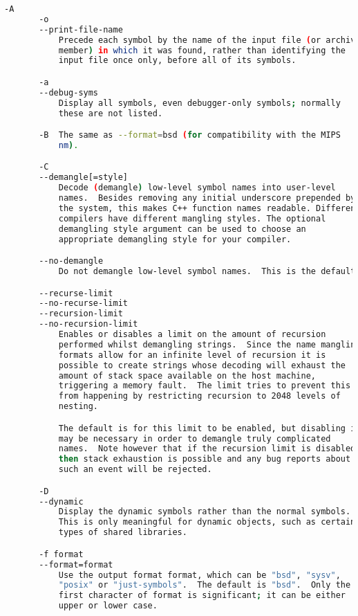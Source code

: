 {{\begin{lstlisting}[language=bash]
       -A
       -o
       --print-file-name
           Precede each symbol by the name of the input file (or archive
           member) in which it was found, rather than identifying the
           input file once only, before all of its symbols.

       -a
       --debug-syms
           Display all symbols, even debugger-only symbols; normally
           these are not listed.

       -B  The same as --format=bsd (for compatibility with the MIPS
           nm).

       -C
       --demangle[=style]
           Decode (demangle) low-level symbol names into user-level
           names.  Besides removing any initial underscore prepended by
           the system, this makes C++ function names readable. Different
           compilers have different mangling styles. The optional
           demangling style argument can be used to choose an
           appropriate demangling style for your compiler.

       --no-demangle
           Do not demangle low-level symbol names.  This is the default.

       --recurse-limit
       --no-recurse-limit
       --recursion-limit
       --no-recursion-limit
           Enables or disables a limit on the amount of recursion
           performed whilst demangling strings.  Since the name mangling
           formats allow for an infinite level of recursion it is
           possible to create strings whose decoding will exhaust the
           amount of stack space available on the host machine,
           triggering a memory fault.  The limit tries to prevent this
           from happening by restricting recursion to 2048 levels of
           nesting.

           The default is for this limit to be enabled, but disabling it
           may be necessary in order to demangle truly complicated
           names.  Note however that if the recursion limit is disabled
           then stack exhaustion is possible and any bug reports about
           such an event will be rejected.

       -D
       --dynamic
           Display the dynamic symbols rather than the normal symbols.
           This is only meaningful for dynamic objects, such as certain
           types of shared libraries.

       -f format
       --format=format
           Use the output format format, which can be "bsd", "sysv",
           "posix" or "just-symbols".  The default is "bsd".  Only the
           first character of format is significant; it can be either
           upper or lower case.


\end{lstlisting}}}
